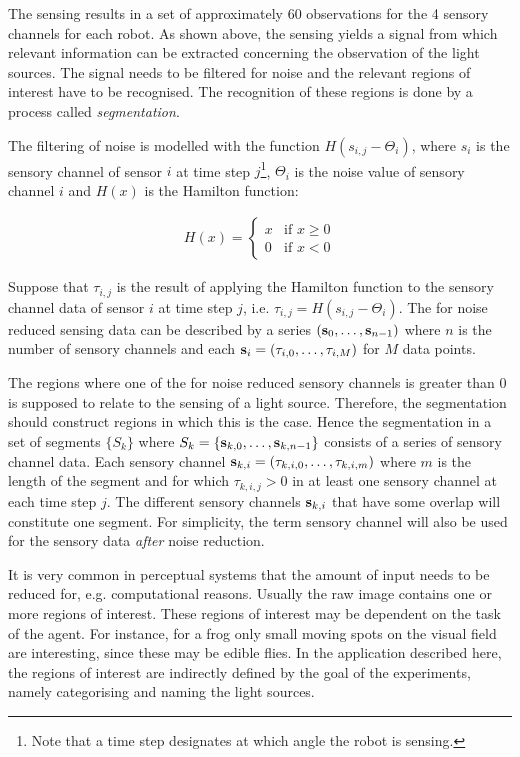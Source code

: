 The sensing results in a set of approximately 60 observations for the 4 sensory channels for each robot. As shown above, the sensing yields a signal from which relevant information can be extracted concerning the observation of the light sources. The signal needs to be filtered for noise and the relevant regions of interest have to be recognised. The recognition of these regions is done by a process called {\em segmentation}. 


The filtering of noise is modelled with the function $H(s_{i,j}-\Theta_i)$, where $s_i$ is the sensory channel of sensor $i$ at time step $j$\footnote{Note that a time step designates at which angle the robot is sensing.}, $\Theta_i$ is the noise value of sensory channel $i$ and $H(x)$ is the Hamilton function:

\begin{eqnarray}
H(x)= \left \{ \begin{array}{rl}
	x & \mbox{if }x \geq 0\\
0 & \mbox{if }x < 0 \end{array} \right. \end{eqnarray}


Suppose that $\tau_{i,j}$ is the result of applying the Hamilton function to the sensory channel data of sensor $i$ at time step $j$, i.e. $\tau_{i,j}=H(s_{i,j}-\Theta_i)$. The for noise reduced sensing data can be described by a series $({\bf s}_0,\ldots,{\bf s}_{n-1})$ where $n$ is the number of sensory channels and each ${\bf s}_i=(\tau_{i,0},\ldots,\tau_{i,M})$ for $M$ data points. 

The regions where one of the for noise reduced sensory channels is greater than 0 is supposed to relate to the sensing of a light source. Therefore, the segmentation should construct regions in which this is the case. Hence the segmentation in a set of segments $\{S_k\}$ where $S_k=\{{\bf s}_{k,0},\ldots,{\bf s}_{k,n-1}\}$ consists of a series of sensory channel data. Each sensory channel ${\bf s}_{k,i}=(\tau_{k,i,0},\ldots,\tau_{k,i,m})$ where $m$ is the length of the segment and for which $\tau_{k,i,j}>0$ in at least one sensory channel at each time step $j$. The different sensory channels ${\bf s}_{k,i}$ that have some overlap will constitute one segment. For simplicity, the term sensory channel will also be used for the sensory data {\em after} noise reduction.


It is very common in perceptual systems that the amount of input needs to be reduced for, e.g. computational reasons. Usually the raw image contains one or more regions of interest. These regions of interest may be dependent on the task of the agent. For instance, for a frog only small moving spots on the visual field are interesting, since these may be edible flies. In the application described here, the regions of interest are indirectly defined by the goal of the experiments, namely categorising and naming the light sources. 

